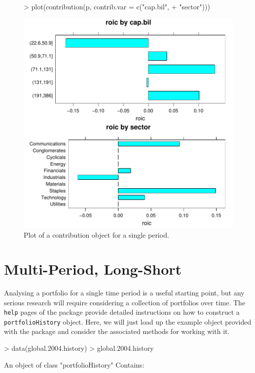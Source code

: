 \documentclass[a4paper]{report}
\begin{document}
\begin{article}
\begin{figure}
\centering
\vspace*{.1in}
\begin{Schunk}
\begin{Sinput}
> plot(contribution(p, contrib.var = c("cap.bil", 
+     "sector")))
\end{Sinput}
\end{Schunk}
\includegraphics{portfolio-015}
\caption{\label{figure:plot.contribution} Plot of a contribution object for a
single period.}
\end{figure}


\section*{Multi-Period, Long-Short}

Analysing a portfolio for a single time period is a useful starting
point, but any serious research will require considering a collection
of portfolios over time. The \texttt{help} pages of the
 package provide detailed instructions on how to
construct a \texttt{portfolioHistory} object. Here, we will just load
up the example object provided with the package and consider the
associated methods for working with it.

\begin{Schunk}
\begin{Sinput}
> data(global.2004.history)
> global.2004.history
\end{Sinput}
\begin{Soutput}
An object of class "portfolioHistory"
Contains:


\end{Soutput}
\end{Schunk}
\end{article}
\end{document}
